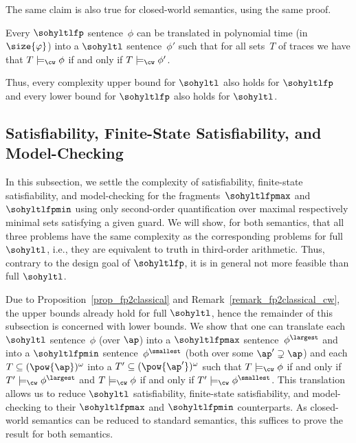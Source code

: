 The same claim is also true for closed-world semantics, using the same proof.

\begin{rem}
\label{remark_fp2classical_cw}
Every $\sohyltlfp$ sentence~$\phi$ can be translated in polynomial time (in $\size{\varphi}$) into a $\sohyltl$ sentence~$\phi'$ such that for all sets~$T$ of traces we have that $T \models_\cw \phi$  if and only if  $T \models_\cw \phi'$.
\end{rem}

Thus, every complexity upper bound for $\sohyltl$ also holds for $\sohyltlfp$ and every lower bound for $\sohyltlfp$ also holds for $\sohyltl$.


\subsection{Satisfiability, Finite-State Satisfiability, and Model-Checking} 

In this subsection, we settle the complexity of satisfiability, finite-state satisfiability, and model-checking for the fragments~$\sohyltlfpmax$ and $\sohyltlfpmin$ using only second-order quantification over maximal respectively minimal sets satisfying a given guard.
We will show, for both semantics, that all three problems have the same complexity as the corresponding problems for full $\sohyltl$, i.e., they are equivalent to truth in third-order arithmetic.
Thus, contrary to the design goal of $\sohyltlfp$, it is in general not more feasible than full $\sohyltl$.

Due to Proposition~\ref{prop_fp2classical} and Remark~\ref{remark_fp2classical_cw}, the upper bounds already hold for full $\sohyltl$, hence the remainder of this subsection is concerned with lower bounds. 
We show that one can translate each $\sohyltl$ sentence~$\phi$ (over $\ap$) into a $\sohyltlfpmax$ sentence~$\phi^\largest$ and into a $\sohyltlfpmin$ sentence~$\phi^\smallest$ (both over some $\ap' \supsetneq \ap$) and each $T \subseteq (\pow{\ap})^\omega$ into a $T' \subseteq (\pow{\ap'})^\omega$ such that $T\models_\cw \phi$ if and only if $T'\models_\cw \phi^\largest$ and $T\models_\cw \phi$ if and only if $T'\models_\cw \phi^\smallest$.
This translation allows us to reduce $\sohyltl$ satisfiability, finite-state satisfiability, and model-checking to their $\sohyltlfpmax$ and $\sohyltlfpmin$ counterparts.
As closed-world semantics can be reduced to standard semantics, this suffices to prove the result for both semantics.

